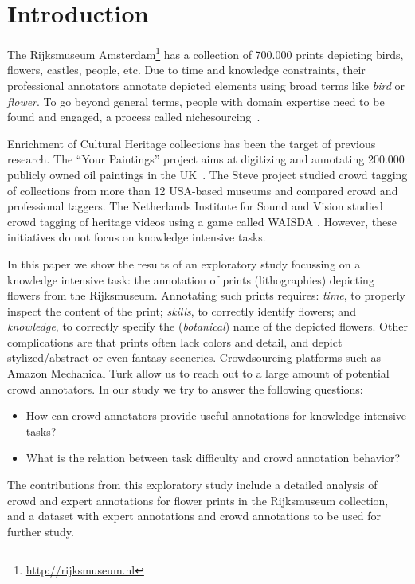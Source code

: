 \documentclass{sig-alternate-2013}
\begin{document}
\section{Introduction}
The Rijksmuseum Amsterdam\footnote{\url{http://rijksmuseum.nl}} has a collection of 700.000 prints depicting birds, flowers, castles, people, etc. Due to time and knowledge constraints, their professional annotators annotate depicted elements using broad terms like \textit{bird} or \textit{flower}. To go beyond general terms, people with domain expertise need to be found and engaged, a process called nichesourcing~\cite{Boer2012}.

Enrichment of Cultural Heritage collections has been the target of previous research. The ``Your Paintings'' project aims at digitizing and annotating 200.000 publicly owned oil paintings in the UK~\cite{Ellis2012}. The Steve project \cite{Trant2006} studied crowd tagging of collections from more than 12 USA-based museums and compared crowd and professional taggers. The Netherlands Institute for Sound and Vision studied crowd tagging of heritage videos using a game called WAISDA \cite{Gligorov2010}. However, these initiatives do not focus on knowledge intensive tasks.

In this paper we show the results of an exploratory study focussing on a knowledge intensive task: the annotation of prints (lithographies) depicting flowers from the Rijksmuseum. Annotating such prints requires: \textit{time}, to properly inspect the content of the print; \textit{skills}, to correctly identify flowers; and \textit{knowledge}, to correctly specify the (\textit{botanical}) name of the depicted flowers. Other complications are that prints often lack colors and detail, and depict stylized/abstract or even fantasy sceneries. Crowdsourcing platforms such as Amazon Mechanical Turk allow us to reach out to a large amount of potential crowd annotators. In our study we try to answer the following questions:

\begin{itemize}
	\item How can crowd annotators provide useful annotations for knowledge intensive tasks?
	\item What is the relation between task difficulty and crowd annotation behavior?
\end{itemize}

The contributions from this exploratory study include a detailed analysis of crowd and expert annotations for flower prints in the Rijksmuseum collection, and a dataset with expert annotations and crowd annotations to be used for further study. 
\end{document}
